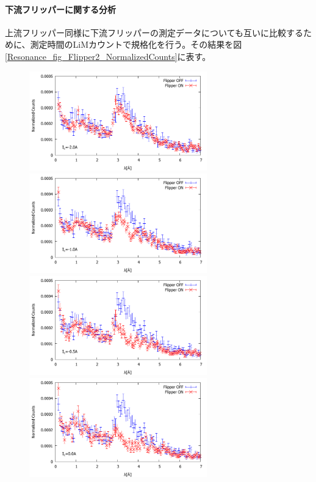 \paragraph{下流フリッパーに関する分析}
上流フリッパー同様に下流フリッパーの測定データについても互いに比較するために、測定時間のLiMカウントで規格化を行う。その結果を図\ref{Resonance_fig_Flipper2_NormalizedCounts}に表す。
\begin{figure}[h]
\includegraphics[height=4.3cm]{resonance/analysis/Flipper2_NormalizedCounts_-20A.pdf}
\includegraphics[height=4.3cm]{resonance/analysis/Flipper2_NormalizedCounts_-10A.pdf}\\
\includegraphics[height=4.3cm]{resonance/analysis/Flipper2_NormalizedCounts_-5A.pdf}
\includegraphics[height=4.3cm]{resonance/analysis/Flipper2_NormalizedCounts_0A.pdf}\\

\end{figure}
